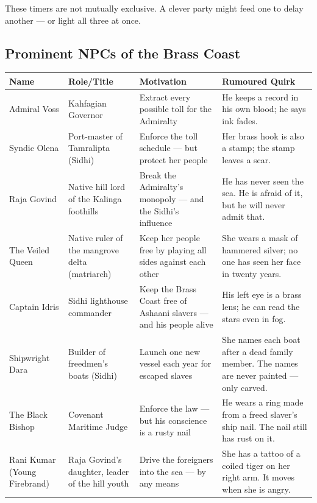 These timers are not mutually exclusive. A clever party might feed one to delay another --- or light all three at once.

\subsection*{Prominent NPCs of the Brass Coast}
\label{sec:brasscoast-npcs}

\begin{longtable}{|p{}|p{}|p{}|p{}|}
\hline
\textbf{Name} & \textbf{Role/Title} & \textbf{Motivation} & \textbf{Rumoured Quirk} \\
\hline
Admiral Voss & Kahfagian Governor & Extract every possible toll for the Admiralty & He keeps a record in his own blood; he says ink fades. \\
\hline
Syndic Olena & Port-master of Tamralipta (Sidhi) & Enforce the toll schedule --- but protect her people & Her brass hook is also a stamp; the stamp leaves a scar. \\
\hline
Raja Govind & Native hill lord of the Kalinga foothills & Break the Admiralty's monopoly --- and the Sidhi's influence & He has never seen the sea. He is afraid of it, but he will never admit that. \\
\hline
The Veiled Queen & Native ruler of the mangrove delta (matriarch) & Keep her people free by playing all sides against each other & She wears a mask of hammered silver; no one has seen her face in twenty years. \\
\hline
Captain Idris & Sidhi lighthouse commander & Keep the Brass Coast free of Ashaani slavers --- and his people alive & His left eye is a brass lens; he can read the stars even in fog. \\
\hline
Shipwright Dara & Builder of freedmen's boats (Sidhi) & Launch one new vessel each year for escaped slaves & She names each boat after a dead family member. The names are never painted --- only carved. \\
\hline
The Black Bishop & Covenant Maritime Judge & Enforce the law --- but his conscience is a rusty nail & He wears a ring made from a freed slaver's ship nail. The nail still has rust on it. \\
\hline
Rani Kumar (Young Firebrand) & Raja Govind's daughter, leader of the hill youth & Drive the foreigners into the sea --- by any means & She has a tattoo of a coiled tiger on her right arm. It moves when she is angry. \\
\hline
\end{longtable}

